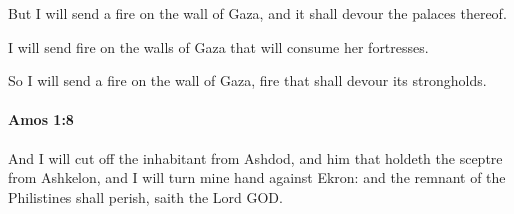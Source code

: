 			\begin{versebox}
					\item[BHS] 
					\item[LXX] 
					\item[ASV] But I will send a fire on the wall of Gaza, and it shall devour the palaces thereof.
					\item[NIV] I will send fire on the walls of Gaza that will consume her fortresses.
					\item[NRSV] So I will send a fire on the wall of Gaza, fire that shall devour its strongholds.
			\end{versebox}

		\paragraph{Amos 1:8} %
			\label{AMOS-1-8}

			And I will cut off the inhabitant from Ashdod, and him that holdeth the sceptre from Ashkelon, and I will turn mine hand against Ekron: and the remnant of the Philistines shall perish, saith the Lord GOD.

